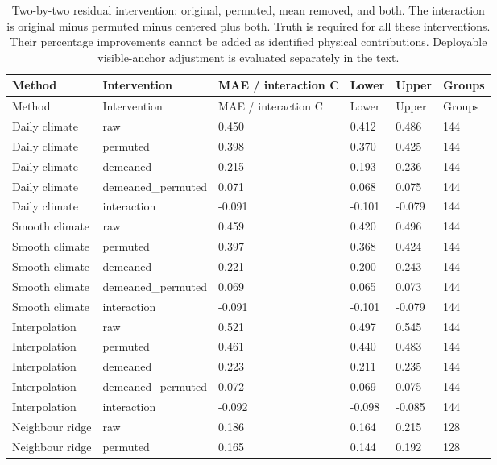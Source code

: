 {\tabletext
\setlength{\tabcolsep}{3pt}
\begin{longtable}{p{}p{}p{}p{}p{}p{}}
\caption{Two-by-two residual intervention: original, permuted, mean removed, and both. The interaction is original minus permuted minus centered plus both. Truth is required for all these interventions. Their percentage improvements cannot be added as identified physical contributions. Deployable visible-anchor adjustment is evaluated separately in the text.}\label{tab:r3si-oracle}\\
\toprule
Method & Intervention & MAE / interaction C & Lower & Upper & Groups \\
\midrule
\endfirsthead
\toprule
Method & Intervention & MAE / interaction C & Lower & Upper & Groups \\
\midrule
\endhead
Daily climate & raw & 0.450 & 0.412 & 0.486 & 144 \\
Daily climate & permuted & 0.398 & 0.370 & 0.425 & 144 \\
Daily climate & demeaned & 0.215 & 0.193 & 0.236 & 144 \\
Daily climate & demeaned\_\allowbreak permuted & 0.071 & 0.068 & 0.075 & 144 \\
Daily climate & interaction & -0.091 & -0.101 & -0.079 & 144 \\
Smooth climate & raw & 0.459 & 0.420 & 0.496 & 144 \\
Smooth climate & permuted & 0.397 & 0.368 & 0.424 & 144 \\
Smooth climate & demeaned & 0.221 & 0.200 & 0.243 & 144 \\
Smooth climate & demeaned\_\allowbreak permuted & 0.069 & 0.065 & 0.073 & 144 \\
Smooth climate & interaction & -0.091 & -0.101 & -0.079 & 144 \\
Interpolation & raw & 0.521 & 0.497 & 0.545 & 144 \\
Interpolation & permuted & 0.461 & 0.440 & 0.483 & 144 \\
Interpolation & demeaned & 0.223 & 0.211 & 0.235 & 144 \\
Interpolation & demeaned\_\allowbreak permuted & 0.072 & 0.069 & 0.075 & 144 \\
Interpolation & interaction & -0.092 & -0.098 & -0.085 & 144 \\
Neighbour ridge & raw & 0.186 & 0.164 & 0.215 & 128 \\
Neighbour ridge & permuted & 0.165 & 0.144 & 0.192 & 128 \\

\end{longtable}}
